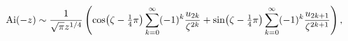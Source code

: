 \[\mathop{\mathrm{Ai}\/}\nolimits\!\left(-z\right)\sim\frac{1}{\sqrt{\pi}z^{1/4}%
}\left(\mathop{\cos\/}\nolimits\!\left(\zeta-\tfrac{1}{4}\pi\right)\sum_{k=0}^%
{\infty}(-1)^{k}\frac{u_{2k}}{\zeta^{2k}}+\mathop{\sin\/}\nolimits\!\left(%
\zeta-\tfrac{1}{4}\pi\right)\sum_{k=0}^{\infty}(-1)^{k}\frac{u_{2k+1}}{\zeta^{%
2k+1}}\right),\]